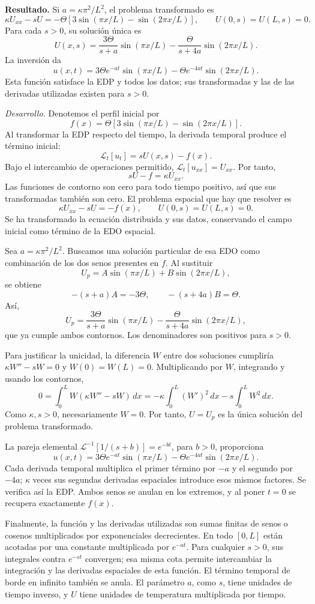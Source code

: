 \noindent\textbf{Resultado.} Si \(a=\kappa\pi^2/L^2\), el problema transformado es
\[
\kappa U_{xx}-sU=-\Theta\left[3\sin(\pi x/L)-\sin(2\pi x/L)\right],
\qquad U(0,s)=U(L,s)=0.
\]
Para cada \(s>0\), su solución única es
\[
U(x,s)=\frac{3\Theta}{s+a}\sin(\pi x/L)
-\frac{\Theta}{s+4a}\sin(2\pi x/L).
\]
La inversión da
\[
u(x,t)=3\Theta e^{-at}\sin(\pi x/L)
-\Theta e^{-4at}\sin(2\pi x/L).
\]
Esta función satisface la EDP y todos los datos; sus transformadas y las de las derivadas utilizadas existen para \(s>0\).

\noindent\textit{Desarrollo.} Denotemos el perfil inicial por
\[
f(x)=\Theta[3\sin(\pi x/L)-\sin(2\pi x/L)].
\]
Al transformar la EDP respecto del tiempo, la derivada temporal produce el término inicial:
\[
\mathcal L_t[u_t]=sU(x,s)-f(x).
\]
Bajo el intercambio de operaciones permitido, \(\mathcal L_t[u_{xx}]=U_{xx}\). Por tanto,
\[
sU-f=\kappa U_{xx}.
\]
Las funciones de contorno son cero para todo tiempo positivo, así que sus transformadas también son cero. El problema espacial que hay que resolver es
\[
\kappa U_{xx}-sU=-f(x),\qquad U(0,s)=U(L,s)=0.
\]
Se ha transformado la ecuación distribuida y sus datos, conservando el campo inicial como término de la EDO espacial.

Sea \(a=\kappa\pi^2/L^2\). Buscamos una solución particular de esa EDO como combinación de los dos senos presentes en \(f\). Al sustituir
\[
U_p=A\sin(\pi x/L)+B\sin(2\pi x/L),
\]
se obtiene
\[
-(s+a)A=-3\Theta,\qquad -(s+4a)B=\Theta.
\]
Así,
\[
U_p=\frac{3\Theta}{s+a}\sin(\pi x/L)
-\frac{\Theta}{s+4a}\sin(2\pi x/L),
\]
que ya cumple ambos contornos. Los denominadores son positivos para \(s>0\).

Para justificar la unicidad, la diferencia \(W\) entre dos soluciones cumpliría \(\kappa W''-sW=0\) y \(W(0)=W(L)=0\). Multiplicando por \(W\), integrando y usando los contornos,
\[
0=\int_0^L W(\kappa W''-sW)\,dx
=-\kappa\int_0^L(W')^2\,dx-s\int_0^L W^2\,dx.
\]
Como \(\kappa,s>0\), necesariamente \(W=0\). Por tanto, \(U=U_p\) es la única solución del problema transformado.

La pareja elemental \(\mathcal L^{-1}[1/(s+b)]=e^{-bt}\), para \(b>0\), proporciona
\[
u(x,t)=3\Theta e^{-at}\sin(\pi x/L)
-\Theta e^{-4at}\sin(2\pi x/L).
\]
Cada derivada temporal multiplica el primer término por \(-a\) y el segundo por \(-4a\); \(\kappa\) veces sus segundas derivadas espaciales introduce esos mismos factores. Se verifica así la EDP. Ambos senos se anulan en los extremos, y al poner \(t=0\) se recupera exactamente \(f(x)\).

Finalmente, la función y las derivadas utilizadas son sumas finitas de senos o cosenos multiplicados por exponenciales decrecientes. En todo \([0,L]\) están acotadas por una constante multiplicada por \(e^{-at}\). Para cualquier \(s>0\), sus integrales contra \(e^{-st}\) convergen; esa misma cota permite intercambiar la integración y las derivadas espaciales de esta función. El término temporal de borde en infinito también se anula. El parámetro \(a\), como \(s\), tiene unidades de tiempo inverso, y \(U\) tiene unidades de temperatura multiplicada por tiempo.
